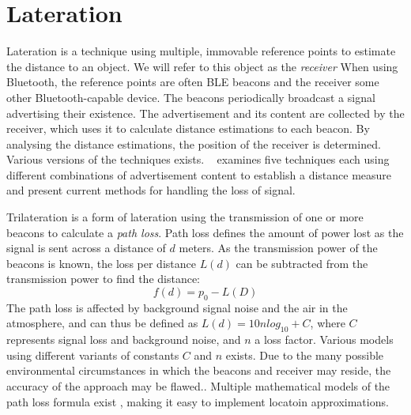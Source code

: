 \section{Lateration}
Lateration is a technique using multiple, immovable reference points to estimate the distance to an object\cite{presence_ble_review}.
We will refer to this object as the \textit{receiver}   
When using Bluetooth, the reference points are often BLE beacons and the receiver some other Bluetooth-capable device. 
The beacons periodically broadcast a signal advertising their existence. 
The advertisement and its content are collected by the receiver, which uses it to calculate distance estimations to each beacon. 
By analysing the distance estimations, the position of the receiver is determined.
Various versions of the techniques exists.
\citeauthor{presence_ble_review}~\cite{presence_ble_review} examines five techniques each using different combinations of advertisement content to establish a distance measure and present current methods for handling the loss of signal.

Trilateration is a form of lateration using the transmission of one or more beacons to calculate a \textit{path loss}.
Path loss defines the amount of power lost as the signal is sent across a distance of $d$ meters.
As the transmission power of the beacons is known, the loss per distance $L(d)$ can be subtracted from the transmission power to find the distance:\cite{taking_localization_to_the_wild}
\begin{equation}
    f(d) = p_0 - L(D)
\end{equation}
The path loss is affected by background signal noise and the air in the atmosphere, and can thus be defined as $L(d) = 10n log_10+C$, where $C$ represents signal loss and background noise, and $n$ a loss factor. \cite{presence_ble_review}
Various models using different variants of constants $C$ and $n$ exists\cite{path_loss_models}.
Due to the many possible environmental circumstances in which the beacons and receiver may reside, the accuracy of the approach may be flawed.\cite{presence_ble_review}. 
Multiple mathematical models of the path loss formula exist \cite{rssi_indoor_pos,positioning_alg_rssi,RSSI_ZigBee_distance}, making it easy to implement locatoin approximations.
